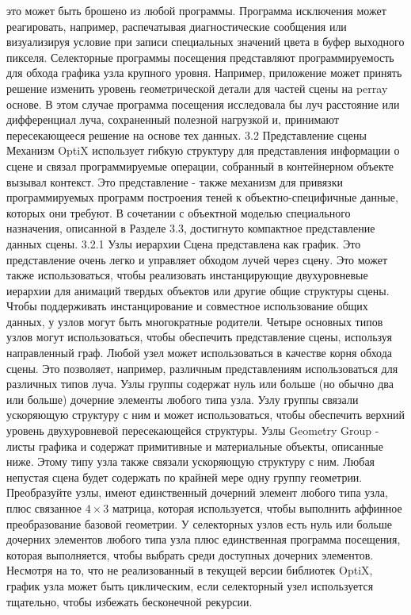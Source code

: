 это может быть брошено из любой программы. Программа исключения может реагировать, например, распечатывая диагностические сообщения или визуализируя условие при записи специальных значений цвета в буфер выходного пикселя. Селекторные программы посещения представляют программируемость для обхода графика узла крупного уровня. Например, приложение может принять решение изменить уровень геометрической детали для частей сцены на perray основе. В этом случае программа посещения исследовала бы луч
расстояние или дифференциал луча, сохраненный полезной нагрузкой и, принимают пересекающееся решение на основе тех данных.
3.2 Представление сцены
Механизм OptiX использует гибкую структуру для представления информации о сцене и связал программируемые операции, собранный в контейнерном объекте вызывал контекст. Это представление - также механизм для привязки программируемых программ построения теней к
объектно-специфичные данные, которых они требуют. В сочетании с объектной моделью специального назначения, описанной в Разделе 3.3, достигнуто компактное представление данных сцены.
3.2.1 Узлы иерархии
Сцена представлена как график. Это представление очень легко и управляет обходом лучей через сцену. Это может также использоваться, чтобы реализовать инстанцирующие двухуровневые иерархии для анимаций твердых объектов или другие общие структуры сцены. Чтобы поддерживать инстанцирование и совместное использование общих данных, у узлов могут быть многократные родители.
Четыре основных типов узлов могут использоваться, чтобы обеспечить представление сцены, используя направленный граф. Любой узел может использоваться в качестве корня обхода сцены. Это позволяет, например, различным представлениям использоваться для различных типов луча. Узлы группы содержат нуль или больше (но обычно два или больше) дочерние элементы любого типа узла. Узлу группы связали ускоряющую структуру с ним и может использоваться, чтобы обеспечить верхний уровень двухуровневой пересекающейся структуры.
Узлы Geometry Group - листы графика и содержат примитивные и материальные объекты, описанные ниже. Этому типу узла также связали ускоряющую структуру с ним. Любая непустая сцена будет содержать по крайней мере одну группу геометрии.
Преобразуйте узлы, имеют единственный дочерний элемент любого типа узла, плюс связанное $4\times3$ матрица, которая используется, чтобы выполнить аффинное преобразование базовой геометрии.
У селекторных узлов есть нуль или больше дочерних элементов любого типа узла плюс единственная программа посещения, которая выполняется, чтобы выбрать среди доступных дочерних элементов. Несмотря на то, что не реализованный в текущей версии библиотек OptiX, график узла может быть циклическим, если селекторный узел используется тщательно, чтобы избежать бесконечной рекурсии.
